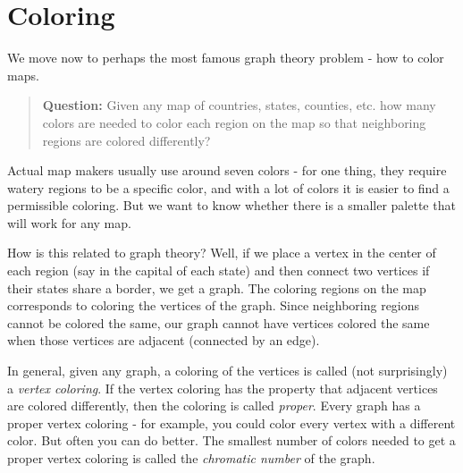 \documentclass[12pt]{article}
\begin{document}
\section{Coloring}

We move now to perhaps the most famous graph theory problem - how to color maps.  

\begin{quote}
  \textbf{Question:} Given any map of countries, states, counties, etc. how many colors are needed to color each region on the map so that neighboring regions are colored differently?
\end{quote}

Actual map makers usually use around seven colors - for one thing, they require watery regions to be a specific color, and with a lot of colors it is easier to find a permissible coloring.  But we want to know whether there is a smaller palette that will work for any map.

How is this related to graph theory?  Well, if we place a vertex in the center of each region (say in the capital of each state) and then connect two vertices if their states share a border, we get a graph.  The coloring regions on the map corresponds to coloring the vertices of the graph.  Since neighboring regions cannot be colored the same, our graph cannot have vertices colored the same when those vertices are adjacent (connected by an edge).

In general, given any graph, a coloring of the vertices is called (not surprisingly) a {\em vertex coloring}.  If the vertex coloring has the property that adjacent vertices are colored differently, then the coloring is called {\em proper}.  Every graph has a proper vertex coloring - for example, you could color every vertex with a different color.  But often you can do better.  The smallest number of colors needed to get a proper vertex coloring is called the {\em chromatic number} of the graph.
\end{document}
